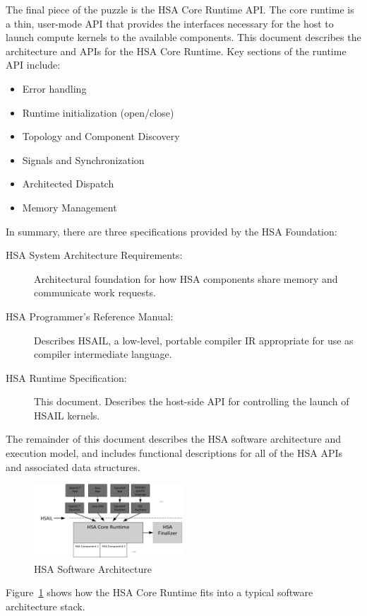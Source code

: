 \documentclass{book}
\begin{document}
The final piece of the puzzle is the HSA Core Runtime API.  The core
runtime is a thin, user-mode API that provides the interfaces
necessary for the host to launch compute kernels to the available
components.  This document describes the architecture and APIs for
the HSA Core Runtime.  Key sections of the runtime API include:
\begin{itemize}
\item Error handling
\item Runtime initialization (open/close)
\item Topology and Component Discovery
\item Signals and Synchronization
\item Architected Dispatch
\item Memory Management
\end{itemize}
In summary, there are three specifications provided by the HSA
Foundation:
\begin{description}
\item[HSA System Architecture Requirements:] Architectural foundation for
how HSA components share memory and communicate work requests.
\item[HSA Programmer’s Reference Manual:] Describes HSAIL, a low-level,
portable compiler IR appropriate for use as compiler intermediate
language.
\item[HSA Runtime Specification:] This document.  Describes the host-side
API for controlling the launch of HSAIL kernels.
\end{description}

The remainder of this document describes the HSA software
architecture and execution model, and includes functional
descriptions for all of the HSA APIs and associated data structures.

\begin{figure}
  \centering
  \includegraphics[width=0.5\textwidth]{fig/swarch}
  \centering
  \caption{HSA Software Architecture}
  \label{fig:swarch}
\end{figure}

Figure~\ref{fig:swarch} shows how the HSA Core Runtime fits into a
typical software architecture stack.
\end{document}
